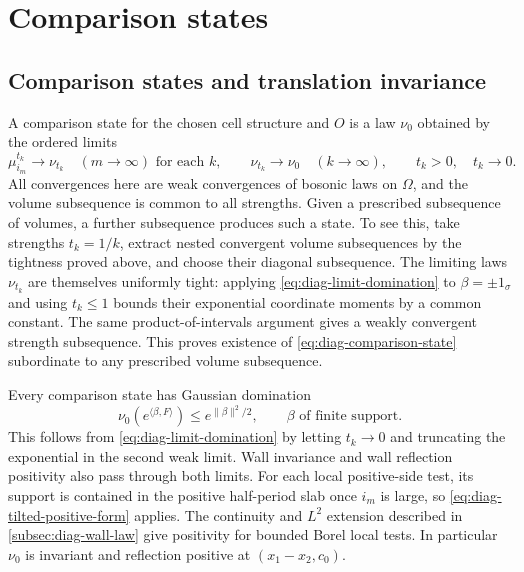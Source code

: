 \section{Comparison states}\label{sec:comparison-states}

\subsection{Comparison states and translation invariance}\label{subsec:diag-comparison-states}

A comparison state for the chosen cell structure and $O$ is
a law $\nu_0$ obtained by the ordered limits
\begin{equation}\label{eq:diag-comparison-state}
 \mu_{i_m}^{t_k}\longrightarrow\nu_{t_k}
       \quad(m\to\infty)\text{ for each }k,
 \qquad
 \nu_{t_k}\longrightarrow\nu_0\quad(k\to\infty),
 \qquad t_k>0,\quad t_k\to0.
\end{equation}
All convergences here are weak convergences of bosonic laws on
$\Omega$, and the volume subsequence is common to all strengths.
Given a prescribed subsequence of volumes, a further subsequence
produces such a state. To see this, take strengths $t_k=1/k$,
extract nested convergent volume subsequences by the tightness
proved above, and choose their diagonal subsequence. The limiting
laws $\nu_{t_k}$ are themselves uniformly tight: applying
\eqref{eq:diag-limit-domination} to $\beta=\pm1_\sigma$ and
using $t_k\le1$ bounds their exponential coordinate moments
by a common constant. The same product-of-intervals argument
gives a weakly convergent strength subsequence. This proves
existence of \eqref{eq:diag-comparison-state} subordinate to
any prescribed volume subsequence.

Every comparison state has Gaussian domination
\begin{equation}\label{eq:diag-comparison-domination}
 \nu_0(e^{\langle\beta,F\rangle})\le e^{\|\beta\|^2/2},
                         \qquad\beta\text{ of finite support}.
\end{equation}
This follows from \eqref{eq:diag-limit-domination} by letting
$t_k\to0$ and truncating the exponential in the second weak
limit. Wall invariance and wall reflection positivity also
pass through both limits. For each local positive-side test,
its support is contained in the positive half-period slab
once $i_m$ is large, so \eqref{eq:diag-tilted-positive-form}
applies. The continuity and $L^2$ extension described in
\cref{subsec:diag-wall-law} give positivity for bounded Borel
local tests. In particular $\nu_0$ is invariant and reflection
positive at $(x_1-x_2,c_0)$.

